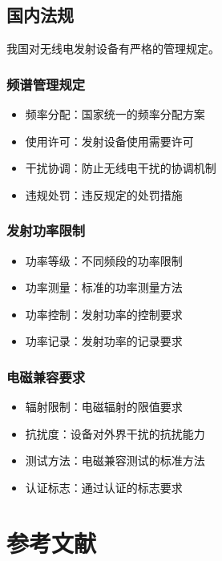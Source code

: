 \documentclass[12pt,UTF8]{ctexbook}
\begin{document}
\section{国内法规}

我国对无线电发射设备有严格的管理规定。

\subsection{频谱管理规定}
\begin{itemize}[leftmargin=3.5em]
    \item 频率分配：国家统一的频率分配方案
    \item 使用许可：发射设备使用需要许可
    \item 干扰协调：防止无线电干扰的协调机制
    \item 违规处罚：违反规定的处罚措施
\end{itemize}

\subsection{发射功率限制}
\begin{itemize}[leftmargin=3.5em]
    \item 功率等级：不同频段的功率限制
    \item 功率测量：标准的功率测量方法
    \item 功率控制：发射功率的控制要求
    \item 功率记录：发射功率的记录要求
\end{itemize}

\subsection{电磁兼容要求}
\begin{itemize}[leftmargin=3.5em]
    \item 辐射限制：电磁辐射的限值要求
    \item 抗扰度：设备对外界干扰的抗扰能力
    \item 测试方法：电磁兼容测试的标准方法
    \item 认证标志：通过认证的标志要求
\end{itemize}

\backmatter

\chapter{参考文献}
\end{document}
